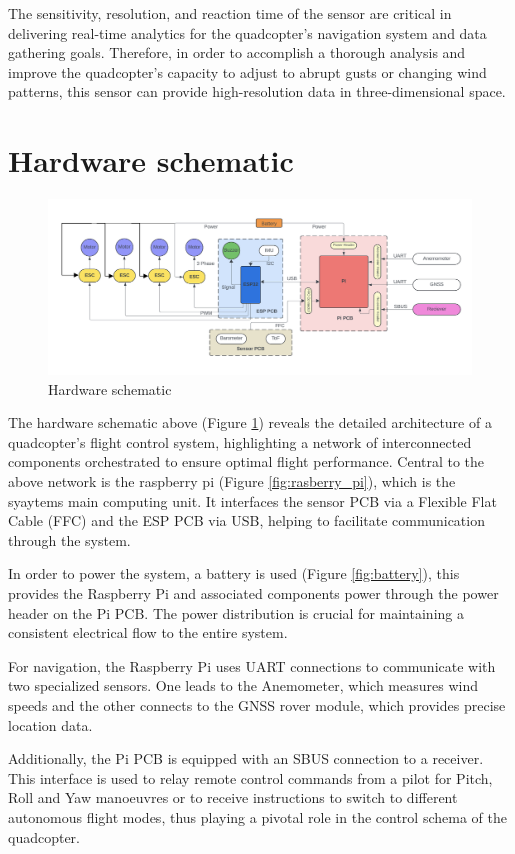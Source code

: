 \documentclass{report}
\begin{document}
The sensitivity, resolution, and reaction time of the sensor are critical in
delivering real-time analytics for the quadcopter's navigation system and data
gathering goals. Therefore, in order to accomplish a thorough analysis and
improve the quadcopter's capacity to adjust to abrupt gusts or changing wind
patterns, this sensor can provide high-resolution data in three-dimensional
space.
\section{Hardware schematic}
\begin{figure}[H]
  \centering
  \includegraphics[width=1\textwidth]{Pictures/Hardware_schematic.png}
  \caption{Hardware schematic}
  \label{fig:hardware_schematic}
\end{figure}

The hardware schematic above (Figure \ref{fig:hardware_schematic}) reveals the
detailed architecture of a quadcopter's flight control system, highlighting a
network of interconnected components orchestrated to ensure optimal flight
performance. Central to the above network is the raspberry pi
(Figure \ref{fig:rasberry_pi}), which is the syaytems main computing unit. It
interfaces the sensor PCB via a Flexible Flat Cable (FFC) and the ESP PCB via
USB, helping to facilitate communication through the system.

In order to power the system, a battery is used (Figure \ref{fig:battery}), this
provides the Raspberry Pi and associated components power through the power
header on the Pi PCB. The power distribution is crucial for maintaining a
consistent electrical flow to the entire system.

For navigation, the Raspberry Pi uses UART connections to communicate with two
specialized sensors. One leads to the Anemometer, which measures wind speeds and
the other connects to the GNSS rover module, which provides precise location
data.

Additionally, the Pi PCB is equipped with an SBUS connection to a receiver. This
interface is used to relay remote control commands from a pilot for Pitch, Roll
and Yaw manoeuvres or to receive instructions to switch to different autonomous
flight modes, thus playing a pivotal role in the control schema of the
quadcopter.
\end{document}

